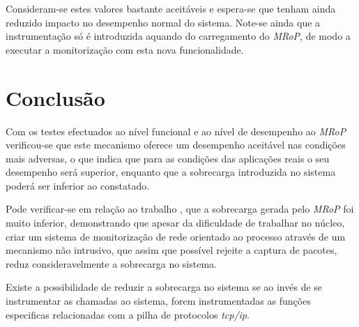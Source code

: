Consideram-se estes valores bastante aceitáveis e espera-se que tenham ainda reduzido impacto no desempenho normal do sistema.
Note-se ainda que a instrumentação só é introduzida aquando do carregamento do \textit{MRoP}, de modo a executar a monitorização com esta nova funcionalidade.

\section{Conclusão}
\label{sec:five_chap_conclusion}

Com os testes efectuados ao nível funcional e ao nível de desempenho ao \textit{MRoP} verificou-se que este mecanismo oferece um desempenho aceitável nas condições mais adversas, o que indica que para as condições das aplicações reais o seu desempenho será superior, enquanto que a sobrecarga introduzida no sistema poderá ser inferior ao constatado.

Pode verificar-se em relação ao trabalho \cite{Farruca:2009}, que a sobrecarga gerada pelo \textit{MRoP} foi muito inferior, demonstrando que apesar da dificuldade de trabalhar no núcleo, criar um sistema de monitorização de rede orientado ao processo através de um mecanismo não intrusivo, que assim que possível rejeite a captura de pacotes, reduz consideravelmente a sobrecarga no sistema.

Existe a possibilidade de reduzir a sobrecarga no sistema se ao invés de se instrumentar as chamadas ao sistema, forem instrumentadas as funções especificas relacionadas com a pilha de protocolos \textit{tcp/ip}.

